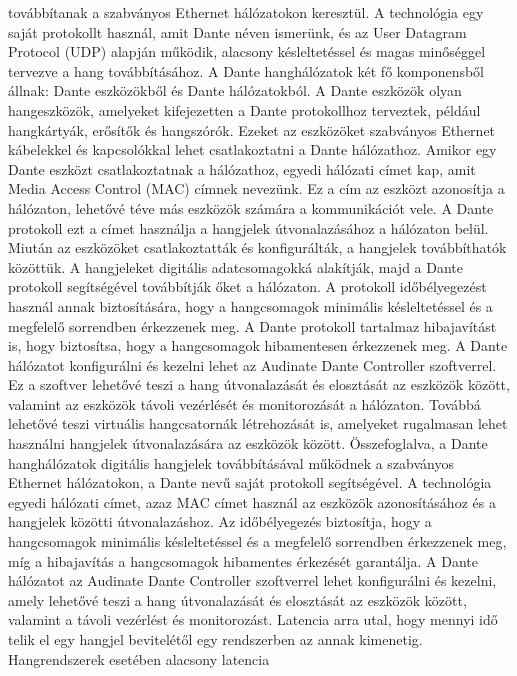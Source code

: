 továbbítanak a szabványos Ethernet hálózatokon keresztül. A technológia egy
saját protokollt használ, amit Dante néven ismerünk, és az User Datagram
Protocol (UDP) alapján működik, alacsony késleltetéssel és magas minőséggel
tervezve a hang továbbításához. A Dante hanghálózatok két fő komponensből állnak:
Dante eszközökből és Dante hálózatokból. A Dante eszközök olyan hangeszközök,
amelyeket kifejezetten a Dante protokollhoz terveztek, például hangkártyák,
erősítők és hangszórók. Ezeket az eszközöket szabványos Ethernet kábelekkel és
kapcsolókkal lehet csatlakoztatni a Dante hálózathoz. Amikor egy Dante eszközt
csatlakoztatnak a hálózathoz, egyedi hálózati címet kap, amit Media Access
Control (MAC) címnek nevezünk. Ez a cím az eszközt azonosítja a hálózaton,
lehetővé téve más eszközök számára a kommunikációt vele. A Dante protokoll ezt a
címet használja a hangjelek útvonalazásához a hálózaton belül. Miután az
eszközöket csatlakoztatták és konfigurálták, a hangjelek továbbíthatók közöttük.
A hangjeleket digitális adatcsomagokká alakítják, majd a Dante protokoll
segítségével továbbítják őket a hálózaton. A protokoll időbélyegezést használ
annak biztosítására, hogy a hangcsomagok minimális késleltetéssel és a megfelelő
sorrendben érkezzenek meg. A Dante protokoll tartalmaz hibajavítást is, hogy
biztosítsa, hogy a hangcsomagok hibamentesen érkezzenek meg. A Dante hálózatot
konfigurálni és kezelni lehet az Audinate Dante Controller szoftverrel. Ez a
szoftver lehetővé teszi a hang útvonalazását és elosztását az eszközök között,
valamint az eszközök távoli vezérlését és monitorozását a hálózaton. Továbbá
lehetővé teszi virtuális hangcsatornák létrehozását is, amelyeket rugalmasan
lehet használni hangjelek útvonalazására az eszközök között. Összefoglalva, a
Dante hanghálózatok digitális hangjelek továbbításával működnek a szabványos
Ethernet hálózatokon, a Dante nevű saját protokoll segítségével. A technológia
egyedi hálózati címet, azaz MAC címet használ az eszközök azonosításához és a
hangjelek közötti útvonalazáshoz. Az időbélyegezés biztosítja, hogy a
hangcsomagok minimális késleltetéssel és a megfelelő sorrendben érkezzenek meg,
míg a hibajavítás a hangcsomagok hibamentes érkezését garantálja. A Dante
hálózatot az Audinate Dante Controller szoftverrel lehet konfigurálni és kezelni,
amely lehetővé teszi a hang útvonalazását és elosztását az eszközök között,
valamint a távoli vezérlést és monitorozást.
Latencia arra utal, hogy mennyi idő telik el egy hangjel bevitelétől egy
rendszerben az annak kimenetig. Hangrendszerek esetében alacsony latencia
